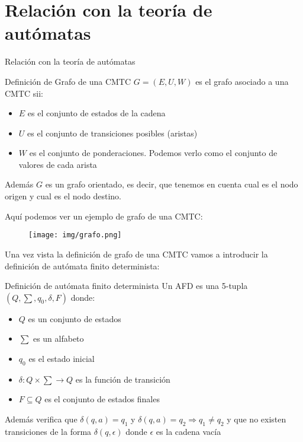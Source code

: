 \documentclass{beamer}
\begin{document}
\section{Relación con la teoría de autómatas}
\begin{frame}{Relación con la teoría de autómatas}
\begin{block}{Definición de Grafo de una CMTC}
$G=(E,U,W)$ es el grafo asociado a una CMTC sii:
\begin{itemize}
\item $E$ es el conjunto de estados de la cadena
\item $U$ es el conjunto de transiciones posibles (aristas)
\item $W$ es el conjunto de ponderaciones. Podemos verlo como el conjunto de valores de cada arista
\end{itemize}
Además $G$ es un grafo orientado, es decir, que tenemos en cuenta cual es el nodo origen y cual es el nodo destino.
\end{block}
\end{frame}
\begin{frame}
Aquí podemos ver un ejemplo de grafo de una CMTC:
\newline
\begin{figure}[h]
  \centering
    \texttt{[image: img/grafo.png]}
  \label{fig:ejemplo}
\end{figure}
Una vez vista la definición de grafo de una CMTC vamos a introducir la definición de autómata finito determinista:
\end{frame}
\begin{frame}
\begin{block}{Definición de autómata finito determinista}
Un AFD es una 5-tupla $(Q,\sum ,q_0,\delta,F)$ donde:
\begin{itemize}
\item $Q$ es un conjunto de estados
\item $\sum$ es un alfabeto
\item $q_0$ es el estado inicial
\item $\delta :Q\times\sum\rightarrow Q$ es la función de transición
\item $F\subseteq Q$ es el conjunto de estados finales
\end{itemize}
Además verifica que $\delta (q,a)=q_1$ y $\delta (q,a)=q_2 \Rightarrow q_1 \neq q_2$ y que no existen transiciones de la forma $\delta(q,\epsilon)$ donde $\epsilon$ es la cadena vacía
\end{block}
\end{frame}
\end{document}
